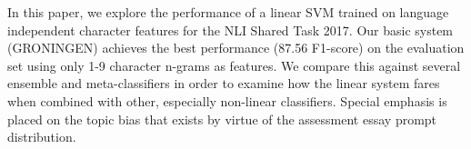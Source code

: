 In this paper, we explore the performance of a linear SVM trained on language independent character features for the NLI Shared Task 2017. Our basic system (GRONINGEN) achieves the best performance (87.56 F1-score) on the evaluation set using only 1-9 character n-grams as features. We compare this against several ensemble and meta-classifiers in order to examine how the linear system fares when combined with other, especially non-linear classifiers. Special emphasis is placed on the topic bias that exists by virtue of the assessment essay prompt distribution.
